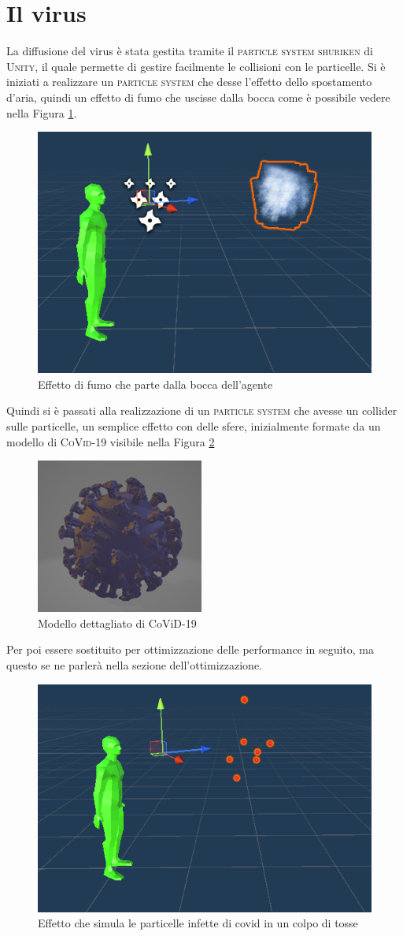 \documentclass[12pt, openany]{book}
\begin{document}
 	\section{Il virus}
 	La diffusione del virus è stata gestita tramite il \textsc{particle system shuriken} di \textsc{Unity}, il quale permette di gestire facilmente le collisioni con le particelle. Si è iniziati a realizzare un \textsc{particle system} che desse l'effetto dello spostamento d'aria, quindi un effetto di fumo che uscisse dalla bocca come è possibile vedere nella Figura \ref{fig:SmokeEffect}.
 	\begin{figure}[H]
 		\centering
 		\includegraphics[width=0.5\linewidth]{"Immagini/SmokeEffect.png"}
 		\caption{Effetto di fumo che parte dalla bocca dell'agente}
 		\label{fig:SmokeEffect}
 	\end{figure}
 	Quindi si è passati alla realizzazione di un \textsc{particle system} che avesse un collider sulle particelle, un semplice effetto con delle sfere, inizialmente formate da un modello di \textsc{CoVid-19} visibile nella Figura \ref{fig:Covid}
 	\begin{figure}[H]
 		\centering
 		\includegraphics[width=0.5\linewidth]{"Immagini/Covid.png"}
 		\caption{Modello dettagliato di CoViD-19}
 		\label{fig:Covid}
 	\end{figure}
 	Per poi essere sostituito per ottimizzazione delle performance in seguito, ma questo se ne parlerà nella sezione dell'ottimizzazione.
 	\begin{figure}[H]
 		\centering
 		\includegraphics[width=0.5\linewidth]{"Immagini/CovidEffect.png"}
 		\caption{Effetto che simula le particelle infette di covid in un colpo di tosse}
 		\label{fig:CovidEffect}
 	\end{figure}
\end{document}
